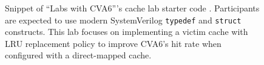 
\begin{figure}[t]
    \centering
    \begin{minipage}{0.8\textwidth}
        \small
        \inputminted[frame=single,]{systemverilog}{media/code/cache_lab/cache.svh}
    \end{minipage}
    \caption[
        C-like constructs in \enquote{Labs with CVA6}
    ]{
        Snippet of \enquote{Labs with CVA6}'s cache lab starter code \cite{labsWithCVA6}. Participants are expected to use modern SystemVerilog \texttt{typedef} and \texttt{struct} constructs. This lab focuses on implementing a victim cache with LRU replacement policy to improve CVA6's hit rate when configured with a direct-mapped cache.
    }
    \label{fig:cache_lab}
\end{figure}
